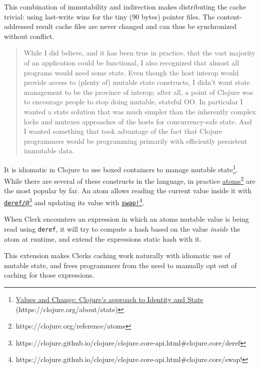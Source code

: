 \documentclass[sigconf,screen]{acmart}
\newcommand{\passthrough}[1]{#1}
\begin{document}
This combination of immutability and indirection makes distributing the cache trivial: using last-write wins for the tiny (90 bytes) pointer files. The content-addressed result cache files are never changed and can thus be synchronized without conflict.

\begin{quote}
While I did believe, and it has been true in practice, that the vast majority of an application could be functional, I also recognized that almost all programs would need some state. Even though the host interop would provide access to (plenty of) mutable state constructs, I didn't want state management to be the province of interop; after all, a point of Clojure was to encourage people to stop doing mutable, stateful OO. In particular I wanted a state solution that was much simpler than the inherently complex locks and mutexes approaches of the hosts for concurrency-safe state. And I wanted something that took advantage of the fact that Clojure programmers would be programming primarily with efficiently persistent immutable data. \cite{Hickey_2020}
\end{quote}

It is idiomatic in Clojure to use boxed containers to manage mutable state\footnote{{\href{https://clojure.org/about/state}{Values and Change: Clojure's approach to Identity and State} (https://clojure.org/about/state)}}. While there are several of these constructs in the language, in practice {\href{https://clojure.org/reference/atoms}{atoms}\footnote{https://clojure.org/reference/atoms}} are the most popular by far. An atom allows reading the current value inside it with {\href{https://clojure.github.io/clojure/clojure.core-api.html\#clojure.core/deref}{\passthrough{\lstinline!deref/@!}}\footnote{https://clojure.github.io/clojure/clojure.core-api.html\#clojure.core/deref}} and updating it\textquotesingle s value with {\href{https://clojure.github.io/clojure/clojure.core-api.html\#clojure.core/swap!}{\passthrough{\lstinline"swap!"}}\footnote{https://clojure.github.io/clojure/clojure.core-api.html\#clojure.core/swap!}}.

When Clerk encounters an expression in which an atom\textquotesingle s mutable value is being read using \passthrough{\lstinline!deref!}, it will try to compute a hash based on the value \emph{inside} the atom  at runtime, and extend the expression\textquotesingle s static hash with it.

This extension makes Clerk\textquotesingle s caching work naturally with idiomatic use of mutable state, and frees programmers from the need to manually opt out of caching for those expressions.
\end{document}
